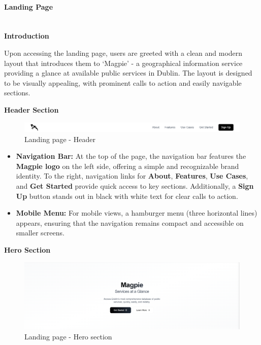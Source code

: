 \paragraph{Landing Page}\mbox{}\\
\textbf{Introduction}

Upon accessing the landing page, users are greeted with a clean and modern layout that introduces them to `Magpie' {-} a geographical information service providing a glance at available public services in Dublin. The layout is designed to be visually appealing, with prominent calls to action and easily navigable sections.

\textbf{Header Section}

\begin{figure}[h]
    \centering{}
    \includegraphics[width=1\textwidth]{images/site/landing/landing_6_header.png}
    \caption{Landing page {-} Header}
\end{figure}
\begin{itemize}
    \item{} \textbf{Navigation Bar:} At the top of the page, the navigation bar features the \textbf{Magpie logo} on the left side, offering a simple and recognizable brand identity. To the right, navigation links for \textbf{About}, \textbf{Features}, \textbf{Use Cases}, and \textbf{Get Started} provide quick access to key sections. Additionally, a \textbf{Sign Up} button stands out in black with white text for clear calls to action.
    \item{} \textbf{Mobile Menu:} For mobile views, a hamburger menu (three horizontal lines) appears, ensuring that the navigation remains compact and accessible on smaller screens.
\end{itemize}

\textbf{Hero Section}

\begin{figure}[h]
    \centering{}
    \includegraphics[width=1\textwidth]{images/site/landing/landing_1_hero.png}
    \caption{Landing page {-} Hero section}
\end{figure}


